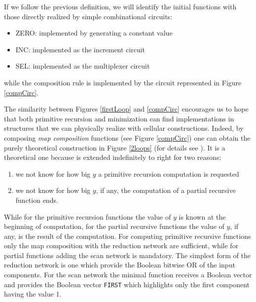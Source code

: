 If we follow the previous definition, we will identify the initial functions with those directly realized by simple combinational circuits:
\begin{itemize}
    \item ZERO: implemented by generating a constant value
    \item INC: implemented as the increment circuit
    \item SEL: implemented as the multiplexer circuit
\end{itemize}
while the composition rule is implemented by the circuit represented in Figure \ref{compCirc}.


The similarity between Figures \ref{firstLoop} and \ref{compCirc} encourages us to hope that both primitive recursion and minimization can find implementations in structures that we can physically realize with cellular constructions. Indeed, by composing {\em map composition} functions (see Figure \ref{compCirc}) one can obtain the purely theoretical construction in Figure \ref{2loops} (for details see \cite{Stefan00}). It is a theoretical one because is extended indefinitely to right for two reasons:
\begin{enumerate}
    \item we not know for how big $y$ a primitive recursion  computation is requested
    \item we not know for how big $y$, if any, the computation of a partial recursive function ends.
\end{enumerate}
While for the primitive recursion functions the value of $y$ is known at the beginning of computation, for the partial recursive functions the value of $y$, if any, is the result of the computation. For computing primitive recursive functions only  the map composition with the reduction network are sufficient, while for partial functions adding the scan network is mandatory. The simplest form of  the reduction network is one which provide the Boolean bitwise OR of the input components. For the scan network the minimal function receives a Boolean vector and provides the Boolean vector {\tt FIRST} which highlights only the first component having the value 1.


